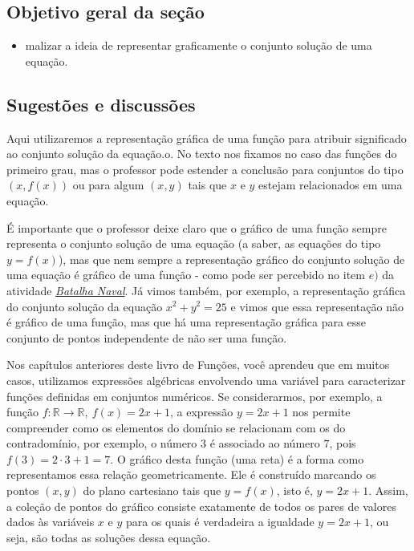 \clearpage
\def\currentcolor{session4}
\begin{texto}
{
  \subsection{Objetivo geral da seção}
  \begin{itemize}
  \item malizar a ideia de representar graficamente o conjunto solução de uma equação.
  \end{itemize}
  \subsection{Sugestões e discussões}

Aqui utilizaremos a representação gráfica de uma função para atribuir significado ao conjunto solução da equação.o. No texto nos fixamos no caso das funções do primeiro grau, mas o professor pode estender a conclusão para conjuntos do tipo $(x,f(x))$ ou para algum $(x,y)$ tais que $x$ e $y$ estejam relacionados em uma equação.

É importante que o professor deixe claro que o gráfico de uma função sempre representa o conjunto solução de uma equação (a saber, as equações do tipo $y=f(x)$), mas que nem sempre a representação gráfico do conjunto solução de uma equação é gráfico de uma função - como pode ser percebido no item $e)$ da atividade \hyperref[batalha-naval]{\textit{Batalha Naval}}. Já vimos também, por exemplo, a representação gráfica do conjunto solução da equação $x^2+y^2=25$ e vimos que essa representação não é gráfico de uma função, mas que há uma representação gráfica para esse conjunto de pontos independente de não ser uma função.
}
\end{texto}
\label{\detokenize{AF107-1:organizando-taxa-de-variacao-media}}\label{\detokenize{AF107-1::doc}}


Nos capítulos anteriores deste livro de Funções, você aprendeu que em muitos casos, utilizamos expressões algébricas envolvendo uma variável para caracterizar funções definidas em conjuntos numéricos. Se considerarmos, por exemplo, a função $f: \mathbb{R} \to \mathbb{R}, \ f(x) = 2x+1$, a expressão $y=2x+1$ nos permite compreender como os elementos do domínio se relacionam com os do contradomínio, por exemplo, o número $3$ é associado ao número $7$, pois $f(3) = 2\cdot 3+1 = 7$. O gráfico desta função (uma reta) é a forma como representamos essa relação geometricamente. Ele é construído marcando os pontos $(x,y)$ do plano cartesiano tais que $y = f(x)$, isto é, $y = 2x+1$. Assim, a coleção de pontos do gráfico consiste exatamente de todos os pares de valores dados às variáveis $x$ e $y$ para os quais é verdadeira a igualdade $y = 2x + 1$, ou seja, são todas as soluções dessa equação.


